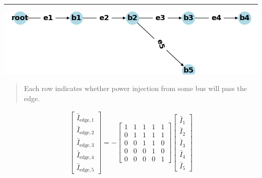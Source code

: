 \documentclass[
]{book}
\begin{document}
\begin{center}\rule{0.5\linewidth}{0.5pt}\end{center}

\begin{center}\includegraphics[width=0.7\linewidth]{Pictures/figCaseSixRaw} \end{center}

\begin{quote}
Each row indicates whether power injection from some bus will pass the edge.
\end{quote}

\[ \begin{aligned}
    \left[\begin{array}{l}
    \bar{I}_{\text{edge}, 1} \\
    \bar{I}_{\text{edge}, 2} \\
    \bar{I}_{\text{edge}, 3} \\
    \bar{I}_{\text{edge}, 4} \\
    \bar{I}_{\text{edge}, 5}
    \end{array}\right]
    = - \left[\begin{array}{lllll}
    1 & 1 & 1 & 1 & 1 \\
    0 & 1 & 1 & 1 & 1 \\
    0 & 0 & 1 & 1 & 0 \\
    0 & 0 & 0 & 1 & 0 \\
    0 & 0 & 0 & 0 & 1
    \end{array}\right]
    \left[\begin{array}{l}
    \bar{I}_{1} \\
    \bar{I}_{2} \\
    \bar{I}_{3} \\
    \bar{I}_{4} \\
    \bar{I}_{5}
    \end{array}\right]
\end{aligned} \]
\end{document}
